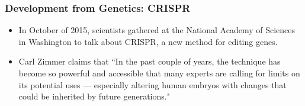 \documentclass{beamer}
\begin{document}
\begin{frame}
\frametitle{Development from Genetics: CRISPR}
\begin{itemize}
\item In October of 2015, scientists gathered at the National Academy of Sciences
in Washington to talk about CRISPR, a new method for editing genes.

\item Carl Zimmer claims that ``In the past couple of years, 
the technique has become so powerful and accessible that many experts are 
calling for limits on its potential uses — especially altering human 
embryos with changes that could be inherited by future generations."
\end{itemize}
\end{frame}
\end{document}
